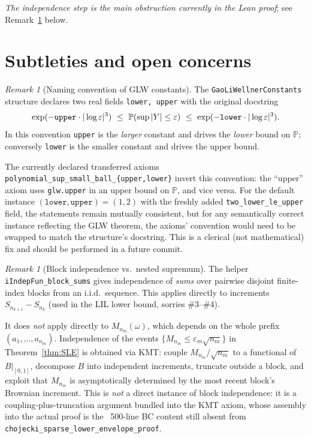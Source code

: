 \documentclass[11pt]{article}
\theoremstyle{plain}
\theoremstyle{definition}
\theoremstyle{remark}
\newtheorem{remark}[theorem]{Remark}
\newcommand{\PP}{\mathbb{P}}
\newcommand{\supnorm}{M}
\newcommand{\eps}{\varepsilon}
\begin{document}
\emph{The independence step is the main obstruction currently in the
Lean proof}; see Remark~\ref{rem:nested} below.

\section{Subtleties and open concerns}\label{sec:subtleties}

\begin{remark}[Naming convention of GLW constants]\label{rem:convention}
The \texttt{GaoLiWellnerConstants} structure declares two real fields
\texttt{lower, upper} with the original docstring
\[
  \exp(-\text{\texttt{upper}}\cdot|\log\eps|^3)\ \le\ \PP(\sup|Y|\le\eps)\ \le\
  \exp(-\text{\texttt{lower}}\cdot|\log\eps|^3).
\]
In this convention \texttt{upper} is the \emph{larger} constant and
drives the \emph{lower} bound on $\PP$; conversely \texttt{lower} is the
smaller constant and drives the upper bound.

The currently declared transferred axioms
\texttt{polynomial\_sup\_small\_ball\_\{upper,lower\}} invert this
convention: the ``upper'' axiom uses \texttt{glw.upper} in an upper
bound on $\PP$, and vice versa. For the default instance
$(\texttt{lower},\texttt{upper}) = (1,2)$ with the freshly added
\texttt{two\_lower\_le\_upper} field, the statements remain mutually
consistent, but for any semantically correct instance reflecting the
GLW theorem, the axioms' convention would need to be swapped to match
the structure's docstring. This is a clerical (not mathematical) fix
and should be performed in a future commit.
\end{remark}

\begin{remark}[Block independence vs.\ nested supremum]\label{rem:nested}
The helper \texttt{iIndepFun\_block\_sums} gives independence of
\emph{sums} over pairwise disjoint finite-index blocks from an i.i.d.\
sequence. This applies directly to increments $S_{n_{k+1}} - S_{n_k}$
(used in the LIL lower bound, sorries \#3--\#4).

It does \emph{not} apply directly to $\supnorm_{n_m}(\omega)$, which
depends on the whole prefix $(a_1,\ldots,a_{n_m})$. Independence of the
events $\{\supnorm_{n_m}\le\eps_m\sqrt{n_m}\}$ in Theorem~\ref{thm:SLE}
is obtained via KMT: couple $\supnorm_{n_m}/\sqrt{n_m}$ to a functional
of $B|_{[0,1]}$, decompose $B$ into independent increments, truncate
outside a block, and exploit that $\supnorm_{n_m}$ is asymptotically
determined by the most recent block's Brownian increment. This is
\emph{not} a direct instance of block independence: it is a
coupling-plus-truncation argument bundled into the KMT axiom, whose
assembly into the actual proof is the ~500-line BC content still
absent from \texttt{chojecki\_sparse\_lower\_envelope\_proof}.
\end{remark}
\end{document}
